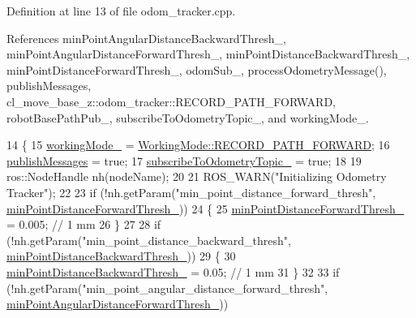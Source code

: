 Definition at line 13 of file odom\+\_\+tracker.\+cpp.



References min\+Point\+Angular\+Distance\+Backward\+Thresh\+\_\+, min\+Point\+Angular\+Distance\+Forward\+Thresh\+\_\+, min\+Point\+Distance\+Backward\+Thresh\+\_\+, min\+Point\+Distance\+Forward\+Thresh\+\_\+, odom\+Sub\+\_\+, process\+Odometry\+Message(), publish\+Messages, cl\+\_\+move\+\_\+base\+\_\+z\+::odom\+\_\+tracker\+::\+R\+E\+C\+O\+R\+D\+\_\+\+P\+A\+T\+H\+\_\+\+F\+O\+R\+W\+A\+RD, robot\+Base\+Path\+Pub\+\_\+, subscribe\+To\+Odometry\+Topic\+\_\+, and working\+Mode\+\_\+.


\begin{DoxyCode}
14 \{
15     \hyperlink{classcl__move__base__z_1_1odom__tracker_1_1OdomTracker_a5ae598c85c4469f4c0e984480575c42b}{workingMode\_} = \hyperlink{namespacecl__move__base__z_1_1odom__tracker_ac46b05813b2791604f6cd0a39ace3ef8a989d06a586bcf9520889228da7faa643}{WorkingMode::RECORD\_PATH\_FORWARD};
16     \hyperlink{classcl__move__base__z_1_1odom__tracker_1_1OdomTracker_a4f253d45ab5750dee3c2f18dd5599725}{publishMessages} = \textcolor{keyword}{true};
17     \hyperlink{classcl__move__base__z_1_1odom__tracker_1_1OdomTracker_afbe614b53a1493eb8268b8ea65b5b93a}{subscribeToOdometryTopic\_} = \textcolor{keyword}{true};
18 
19     ros::NodeHandle nh(nodeName);
20 
21     ROS\_WARN(\textcolor{stringliteral}{"Initializing Odometry Tracker"});
22 
23     \textcolor{keywordflow}{if} (!nh.getParam(\textcolor{stringliteral}{"min\_point\_distance\_forward\_thresh"}, 
      \hyperlink{classcl__move__base__z_1_1odom__tracker_1_1OdomTracker_a2a11c48d1da1f1c9b921ef37c8db6325}{minPointDistanceForwardThresh\_}))
24     \{
25         \hyperlink{classcl__move__base__z_1_1odom__tracker_1_1OdomTracker_a2a11c48d1da1f1c9b921ef37c8db6325}{minPointDistanceForwardThresh\_} = 0.005; \textcolor{comment}{// 1 mm}
26     \}
27 
28     \textcolor{keywordflow}{if} (!nh.getParam(\textcolor{stringliteral}{"min\_point\_distance\_backward\_thresh"}, 
      \hyperlink{classcl__move__base__z_1_1odom__tracker_1_1OdomTracker_ac1c711aabcc005981c256f8f45c0555b}{minPointDistanceBackwardThresh\_}))
29     \{
30         \hyperlink{classcl__move__base__z_1_1odom__tracker_1_1OdomTracker_ac1c711aabcc005981c256f8f45c0555b}{minPointDistanceBackwardThresh\_} = 0.05; \textcolor{comment}{// 1 mm}
31     \}
32 
33     \textcolor{keywordflow}{if} (!nh.getParam(\textcolor{stringliteral}{"min\_point\_angular\_distance\_forward\_thresh"}, 
      \hyperlink{classcl__move__base__z_1_1odom__tracker_1_1OdomTracker_a3567ebfbc56db63e0fad52e0c4936c30}{minPointAngularDistanceForwardThresh\_}))

\end{DoxyCode}
